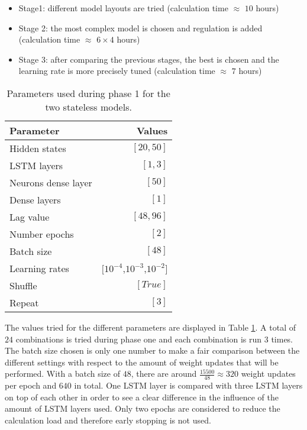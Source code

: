 \begin{itemize}
	\item Stage1: different model layouts are tried (calculation time $ \approx $ $ 10 $ hours)
	\item Stage 2: the most complex model is chosen and regulation is added (calculation time $ \approx $ $ 6\times4 $ hours)
	\item Stage 3: after comparing the previous stages, the best is chosen and the learning rate is more precisely tuned (calculation time $ \approx $ $7$ hours)
\end{itemize}

\begin{table}[ht]
	\centering
	\begin{tabular}{@{}l|r@{}} \toprule
		\textbf{Parameter}	& \textbf{Values}\\\midrule
		Hidden states &  $ [20,50] $\\
		LSTM layers & $ [1,3] $\\
		Neurons dense layer & $ [50] $\\
		Dense layers & $ [1] $\\
		Lag value & $ [48,96] $\\
		Number epochs & $ [2] $\\
		Batch size & $ [48] $\\
		Learning rates & $[ 10^{-4} $,$ 10^{-3} $,$ 10^{-2} ]$\\
		Shuffle & $ [True] $\\
		Repeat & $ [3] $\\\bottomrule
	\end{tabular}
	\caption{Parameters used during phase 1 for the two stateless models.}
	\label{tab:para_phase1}
\end{table}

The values tried for the different parameters are displayed in Table \ref{tab:para_phase1}. A total of $ 24 $ combinations is tried during phase one and each combination is run $ 3 $ times. The batch size chosen is only one number to make a fair comparison between the different settings with respect to the amount of weight updates that will be performed. With a batch size of $ 48 $, there are around $ \frac{15500}{48}\approx 320 $ weight updates per epoch and $ 640 $ in total. One LSTM layer is compared with three LSTM layers on top of each other in order to see a clear difference in the influence of the amount of LSTM layers used. Only two epochs are considered to reduce the calculation load and therefore early stopping is not used.\\

